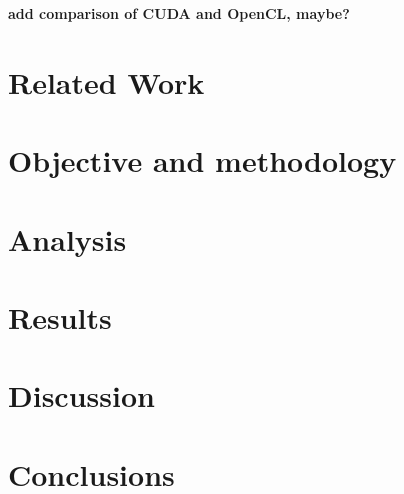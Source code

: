 \documentclass[10pt,onecolumn,twoside,english,a4paper]{article}
\begin{document}
\textbf{add comparison of CUDA and OpenCL, maybe?}

\section{Related Work} \label{Related work}

\section{Objective and methodology} \label{Objective}

\section{Analysis} \label{Analysis}

\section{Results} \label{Results}

\section{Discussion} \label{Discussion}

\section{Conclusions} \label{Conclusions} %



\end{document}
